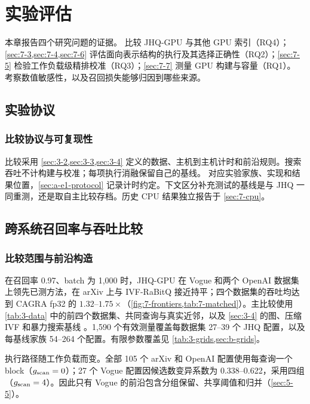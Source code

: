 \chapter{实验评估}
\label{ch:evaluation}

本章报告四个研究问题的证据。 比较 JHQ-GPU 与其他 GPU 索引（RQ4）；\cref{sec:7-3,sec:7-4,sec:7-6} 评估面向表示结构的执行及其选择正确性（RQ2）；\cref{sec:7-5} 检验工作负载级精排校准（RQ3）；\cref{sec:7-7} 测量 GPU 构建与容量（RQ1）。 考察数值敏感性，以及召回损失能够归因到哪些来源。

\section{实验协议}
\label{sec:7-1}

\subsection{比较协议与可复现性}

比较采用 \cref{sec:3-2,sec:3-3,sec:3-4} 定义的数据、主机到主机计时和前沿规则。搜索吞吐不计构建与校准；每项执行消融保留自己的基线。 对应实验家族、实现和结果位置，\cref{sec:a-e1-protocol} 记录计时约定。下文区分补充测试的基线是与 JHQ 一同重测，还是取自主比较存档。历史 CPU 结果独立报告于 \cref{sec:7-cpu}。

\section{跨系统召回率与吞吐比较}
\label{sec:7-2}

\subsection{比较范围与前沿构造}

在召回率 0.97、batch 为 1,000 时，JHQ-GPU 在 Vogue 和两个 OpenAI 数据集上领先已测方法，在 arXiv 上与 IVF-RaBitQ 接近持平；四个数据集的吞吐均达到 CAGRA fp32 的 $1.32$--$1.75\times$（\cref{fig:7-frontiers,tab:7-matched}）。主比较使用 \cref{tab:3-data} 中的前四个数据集、共同查询与真实近邻，以及 \cref{sec:3-4} 的图、压缩 IVF 和暴力搜索基线 \cite{cagra,pq,ivfrabitq}。1,590 个有效测量覆盖每数据集 27--39 个 JHQ 配置，以及每基线家族 54--264 个配置。有限参数覆盖见 \cref{tab:3-grids,sec:b-grids}。

执行路径随工作负载而变。全部 105 个 arXiv 和 OpenAI 配置使用每查询一个 block（$g_{\mathrm{scan}}=0$）；27 个 Vogue 配置因候选数变异系数为 0.338--0.622，采用四组（$g_{\mathrm{scan}}=4$）。因此只有 Vogue 的前沿包含分组保留、共享阈值和归并（\cref{sec:5-5}）。

